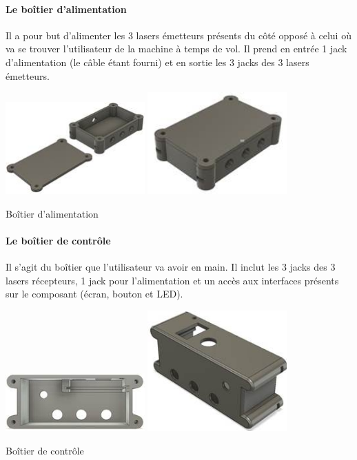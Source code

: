\paragraph{Le boîtier d’alimentation}
Il a pour but d’alimenter les 3 lasers émetteurs présents du côté opposé à celui où va se trouver l’utilisateur de la machine à temps de vol. Il prend en entrée 1 jack d’alimentation (le câble étant fourni) et en sortie les 3 jacks des 3 lasers émetteurs.
\begin{center}
    \includegraphics[width=0.4\textwidth]{photoHugo/image023}
    \includegraphics[width=0.4\textwidth]{photoHugo/image025}
    
    Boîtier d'alimentation
\end{center}
\paragraph{Le boîtier de contrôle}
Il s’agit du boîtier que l’utilisateur va avoir en main. Il inclut les 3 jacks des 3 lasers récepteurs, 1 jack pour l’alimentation et un accès aux interfaces présents sur le composant (écran, bouton et LED). 
\begin{center}
    \includegraphics[width=0.4\textwidth]{photoHugo/image027}
    \includegraphics[width=0.4\textwidth]{photoHugo/image029}
    
    Boîtier de contrôle
\end{center}

